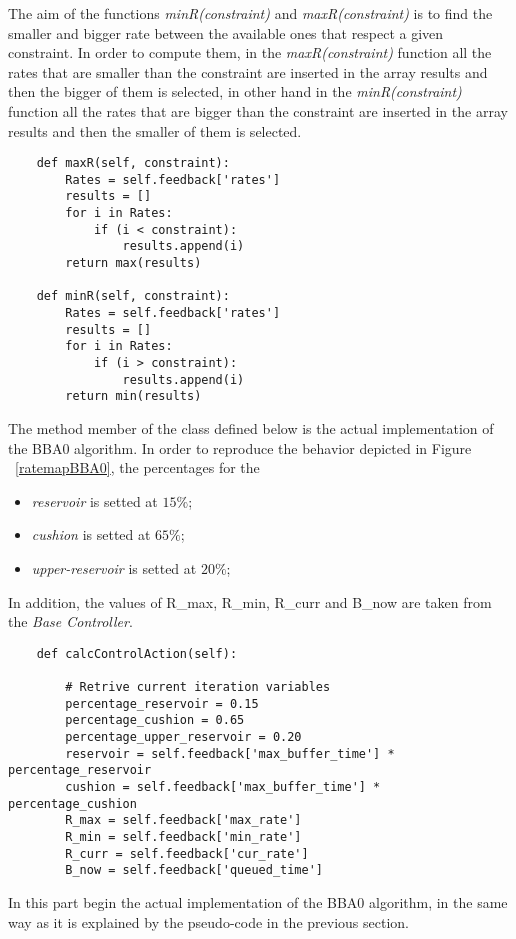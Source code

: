\documentclass[a4paper]{report}
\begin{document}
The aim of the functions \textit{minR(constraint)} and \textit{maxR(constraint)} is to find the smaller and bigger rate between the available ones that respect a given constraint. In order to compute them, in the \textit{maxR(constraint)} function all the rates that are smaller than the constraint are inserted in the array results and then the bigger of them is selected, in other hand in the \textit{minR(constraint)} function all the rates that are bigger than the constraint are inserted in the array results and then the smaller of them is selected.

\begin{Verbatim}
    def maxR(self, constraint):
        Rates = self.feedback['rates']
        results = []
        for i in Rates:
            if (i < constraint):
                results.append(i)
        return max(results)

    def minR(self, constraint):
        Rates = self.feedback['rates']
        results = []
        for i in Rates:
            if (i > constraint):
                results.append(i)
        return min(results)
\end{Verbatim}

The method member of the class defined below is the actual implementation of the BBA0 algorithm. In order to reproduce the behavior depicted in Figure ~\ref{ratemapBBA0}, the percentages for the
\begin{itemize}
\item \textit{reservoir} is setted at $15\%$;
\item \textit{cushion} is setted at $65\%$;
\item \textit{upper-reservoir} is setted at $20\%$;
\end{itemize}
In addition, the values of R\_max, R\_min, R\_curr and B\_now are taken from the \textit{Base Controller}.
\begin{Verbatim}
    def calcControlAction(self):

        # Retrive current iteration variables
        percentage_reservoir = 0.15
        percentage_cushion = 0.65
        percentage_upper_reservoir = 0.20
        reservoir = self.feedback['max_buffer_time'] * percentage_reservoir
        cushion = self.feedback['max_buffer_time'] * percentage_cushion
        R_max = self.feedback['max_rate']
        R_min = self.feedback['min_rate']
        R_curr = self.feedback['cur_rate']
        B_now = self.feedback['queued_time']
\end{Verbatim}

In this part begin the actual implementation of the BBA0 algorithm, in the same way as it is explained by the pseudo-code in the previous section.
\end{document}
